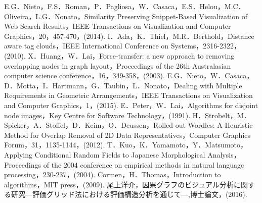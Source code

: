 \documentclass[syuuron]{kuee}
\begin{document}
\begin{thebibliography}{数字}
	 E.G．Nieto，F.S．Roman，P．Pagliosa，W．Casaca，E.S．Helou，M.C．Oliveira，L.G．Nonato，Similarity Preserving Snippet-Based Visualization of Web Search Results，IEEE Transactions on Visualization and Computer Graphics，20，457-470，(2014).
	 I．Ada，K．Thiel，M.R．Berthold，Distance aware tag clouds，IEEE International Conference on Systems，2316-2322，(2010).
	 X．Huang，W．Lai，Force-transfer: a new approach to removing overlapping nodes in graph layout，Proceedings of the 26th Australasian computer science conference，16，349-358，(2003).
	 E.G．Nieto，W．Casaca，D．Motta，I．Hartmann，G．Taubin，L．Nonato，Dealing with Multiple Requirements in Geometric Arrangements，IEEE Transactions on Visualization and Computer Graphics，1，(2015).
	 E．Peter，W．Lai，Algorithms for disjoint node images，Key Centre for Software Technology，(1991).
	 H．Strobelt，M．Spicker，A．Stoffel，D．Keim，O．Deussen，Rolled‐out Wordles: A Heuristic Method for Overlap Removal of 2D Data Representatives，Computer Graphics Forum，31，1135-1144，(2012).
	 T．Kuo，K．Yamamoto，Y．Matsumoto，Applying Conditional Random Fields to Japanese Morphological Analysis，Proceedings of the 2004 conference on empirical methods in natural language processing，230-237，(2004).
	 Cormen，H．Thomas，Introduction to algorithms，MIT press，(2009).
	 尾上洋介，因果グラフのビジュアル分析に関する研究—評価グリッド法における評価構造分析を通じて—,博士論文，(2016).
\end{thebibliography}

\appendix
\end{document}
